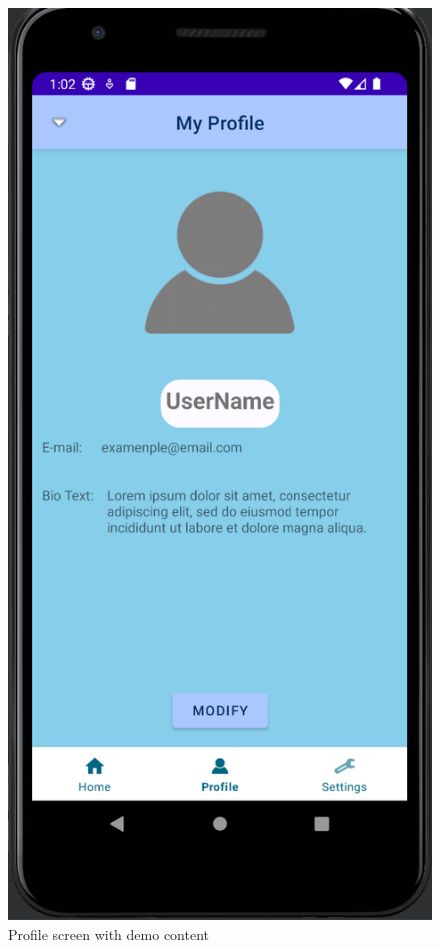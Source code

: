 \begin{figure}
	\centering
	\includegraphics[width=.7\linewidth]{figures/profile_dummy.png}
	\caption{Profile screen with demo content}
	\label{fig:profile_screen}
\end{figure}